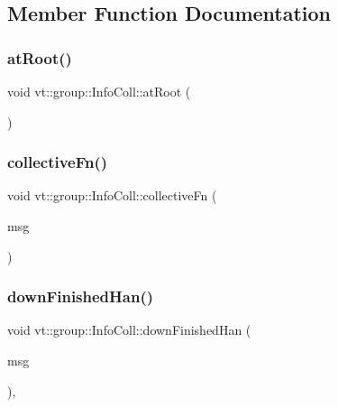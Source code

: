 \subsection{Member Function Documentation}
\mbox{\label{structvt_1_1group_1_1_info_coll_a04b8c9b9339fb348bf869dab130280eb}} 
\subsubsection{\texorpdfstring{at\+Root()}{atRoot()}}
{\footnotesize\ttfamily void vt\+::group\+::\+Info\+Coll\+::at\+Root (\begin{DoxyParamCaption}{ }\end{DoxyParamCaption})\hspace{0.3cm}{\ttfamily [private]}}

\mbox{\label{structvt_1_1group_1_1_info_coll_a0064a94b70d12132ed580f4a92111f47}} 
\subsubsection{\texorpdfstring{collective\+Fn()}{collectiveFn()}}
{\footnotesize\ttfamily void vt\+::group\+::\+Info\+Coll\+::collective\+Fn (\begin{DoxyParamCaption}\item[{\hyperlink{namespacevt_ab2b3d506ec8e8d1540aede826d84a239}{Msg\+Shared\+Ptr}$<$ \hyperlink{namespacevt_1_1group_a4c1183efe0185992fefb3ab38a55a8a7}{Group\+Collective\+Msg} $>$}]{msg }\end{DoxyParamCaption})\hspace{0.3cm}{\ttfamily [private]}}

\mbox{\label{structvt_1_1group_1_1_info_coll_ac932b886b6e0beac88966f0f0edae68a}} 
\subsubsection{\texorpdfstring{down\+Finished\+Han()}{downFinishedHan()}}
{\footnotesize\ttfamily void vt\+::group\+::\+Info\+Coll\+::down\+Finished\+Han (\begin{DoxyParamCaption}\item[{\hyperlink{namespacevt_1_1group_a864fcf6bc821eacf8350bf4ad15e51b3}{Group\+Only\+Msg} $\ast$}]{msg }\end{DoxyParamCaption})\hspace{0.3cm}{\ttfamily [static]}, {\ttfamily [protected]}}

